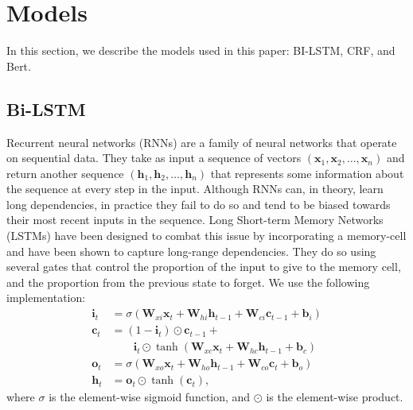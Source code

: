 \section{Models}
In this section, we describe the models used in this paper: BI-LSTM, CRF, and Bert. 


\subsection{Bi-LSTM}
\label{sec:lstm}

Recurrent neural networks (RNNs) are a family of neural networks that operate on sequential data. They take as input a sequence of vectors $(\mathbf{x}_1, \mathbf{x}_2, \ldots, \mathbf{x}_n)$ and return another sequence $(\mathbf{h}_1, \mathbf{h}_2, \ldots, \mathbf{h}_n)$ that represents some information about the sequence at every step in the input. Although RNNs can, in theory, learn long dependencies, in practice they fail to do so and tend to be biased towards their most recent inputs in the sequence. Long Short-term Memory Networks (LSTMs) have been designed to combat this issue by incorporating a memory-cell and have been shown to capture long-range dependencies. They do so using several gates that control the proportion of the input to give to the memory cell, and the proportion from the previous state to forget.
We use the following implementation:
\\
\begin{align*}
\mathbf{i}_{t} &= \sigma(\mathbf{W}_{xi}\mathbf{x}_{t} + \mathbf{W}_{hi}\mathbf{h}_{t-1} + \mathbf{W}_{ci}\mathbf{c}_{t-1} + \mathbf{b}_{i})\\
\mathbf{c}_{t} &= (1 - \mathbf{i}_{t})\odot\mathbf{c}_{t-1} +\\
&\qquad \mathbf{i}_{t}\odot \tanh(\mathbf{W}_{xc}\mathbf{x}_{t} + \mathbf{W}_{hc}\mathbf{h}_{t-1} + \mathbf{b}_{c})\\
\mathbf{o}_{t} &= \sigma(\mathbf{W}_{xo}\mathbf{x}_{t} + \mathbf{W}_{ho}\mathbf{h}_{t-1} + \mathbf{W}_{co}\mathbf{c}_{t} + \mathbf{b}_{o})\\
\mathbf{h}_{t} &= \mathbf{o}_{t}\odot\tanh(\mathbf{c}_{t}),
\end{align*}
where $\sigma$ is the element-wise sigmoid function, and $\odot$ is the element-wise product.

